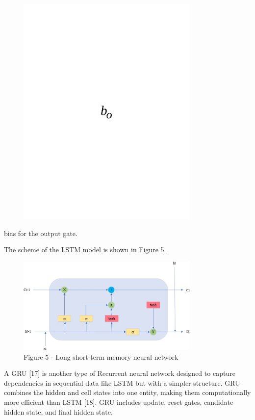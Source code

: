 \begin{figure}[H]
	\centering
	\includegraphics[width=0.8\textwidth]{media/ict/image62}
	\caption*{}
\end{figure}

bias for the output gate.

The scheme of the LSTM model is shown in Figure 5.

\begin{figure}[H]
	\centering
	\includegraphics[width=0.8\textwidth]{media/ict/image63}
	\caption*{Figure 5 - Long short-term memory neural network}
\end{figure}

A GRU {[}17{]} is another type of Recurrent neural network designed to
capture dependencies in sequential data like LSTM but with a simpler
structure. GRU combines the hidden and cell states into one entity,
making them computationally more efficient than LSTM {[}18{]}. GRU
includes update, reset gates, candidate hidden state, and final hidden
state.

